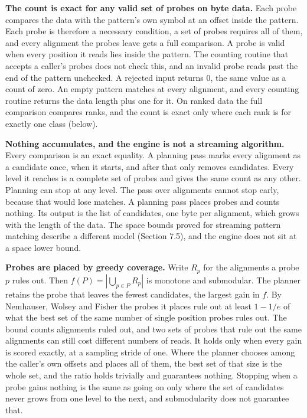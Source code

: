 \noindent\textbf{The count is exact for any valid set of probes on byte data.} Each probe compares the data with the pattern's own symbol at an offset inside the pattern. Each probe is therefore a necessary condition, a set of probes requires all of them, and every alignment the probes leave gets a full comparison. A probe is valid when every position it reads lies inside the pattern. The counting routine that accepts a caller's probes does not check this, and an invalid probe reads past the end of the pattern unchecked. A rejected input returns 0, the same value as a count of zero. An empty pattern matches at every alignment, and every counting routine returns the data length plus one for it. On ranked data the full comparison compares ranks, and the count is exact only where each rank is for exactly one class (below).

\noindent\textbf{Nothing accumulates, and the engine is not a streaming algorithm.} Every comparison is an exact equality. A planning pass marks every alignment as a candidate once, when it starts, and after that only removes candidates. Every level it reaches is a complete set of probes and gives the same count as any other. Planning can stop at any level. The pass over alignments cannot stop early, because that would lose matches. A planning pass places probes and counts nothing. Its output is the list of candidates, one byte per alignment, which grows with the length of the data. The space bounds proved for streaming pattern matching describe a different model (Section 7.5), and the engine does not sit at a space lower bound.

\noindent\textbf{Probes are placed by greedy coverage.} Write \(R_p\) for the alignments a probe \(p\) rules out. Then \(f(P) = |\bigcup_{p \in P} R_p|\) is monotone and submodular. The planner retains the probe that leaves the fewest candidates, the largest gain in \(f\). By Nemhauser, Wolsey and Fisher \cite{src:Nemhauser-Wolsey-and-Fisher} the probes it places rule out at least \(1 - 1/e\) of what the best set of the same number of single position probes rules out. The bound counts alignments ruled out, and two sets of probes that rule out the same alignments can still cost different numbers of reads. It holds only when every gain is scored exactly, at a sampling stride of one. Where the planner chooses among the caller's own offsets and places all of them, the best set of that size is the whole set, and the ratio holds trivially and guarantees nothing. Stopping when a probe gains nothing is the same as going on only where the set of candidates never grows from one level to the next, and submodularity does not guarantee that.

